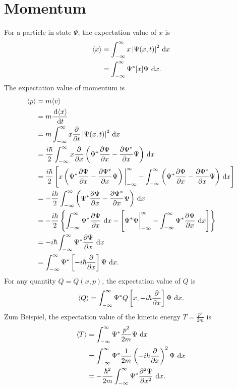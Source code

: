 \documentclass[en, oneside]{vivi}
\begin{document}
\section{Momentum}
For a particle in state $\Psi$, the expectation value of $x$ is
\begin{align}
    \langle x \rangle &= \int_{-\infty}^{\infty} x \left\lvert \Psi(x,t) \right\rvert^2 \dif x\\
    &= \int_{-\infty}^{\infty}  \Psi^* [x] \Psi \dif x.
\end{align}
The expectation value of momentum is
\begin{align}
    \langle p \rangle &= m \langle v \rangle\\
    &= m \frac{\dif \langle x \rangle}{\dif t}\\
    &= m \int_{-\infty}^{\infty} x \frac{\partial}{\partial t} \left\lvert \Psi(x,t) \right\rvert^2 \dif x\\
    &= \frac{i \hbar}{2}\int_{-\infty}^{\infty} x \frac{\partial}{\partial x} \left( \Psi^*\frac{\partial \Psi}{\partial x} - \frac{\partial \Psi^*}{\partial x}\Psi \right) \dif x\\
    &= \frac{i \hbar}{2}\left[x\left( \Psi^*\frac{\partial \Psi}{\partial x} - \frac{\partial \Psi^*}{\partial x}\Psi \right)\bigg|_{-\infty}^{\infty} -
    \int_{-\infty}^{\infty} \left( \Psi^*\frac{\partial \Psi}{\partial x} - \frac{\partial \Psi^*}{\partial x}\Psi \right) \dif x\right]\\
    &= -\frac{i \hbar}{2}\int_{-\infty}^{\infty} \left( \Psi^*\frac{\partial \Psi}{\partial x} - \frac{\partial \Psi^*}{\partial x}\Psi \right) \dif x\\
    &= -\frac{i \hbar}{2}\left\{ \int_{-\infty}^{\infty} \Psi^*\frac{\partial \Psi}{\partial x} \dif x - \left[\Psi^*\Psi\bigg|_{-\infty}^{\infty} - \int_{-\infty}^{\infty} \Psi^*\frac{\partial \Psi}{\partial x} \dif x\right] \right\}\\
    &= -i \hbar \int_{-\infty}^{\infty} \Psi^*\frac{\partial \Psi}{\partial x} \dif x\\
    &= \int_{-\infty}^{\infty} \Psi^*\left[ -i \hbar \frac{\partial}{\partial x} \right]\Psi \dif x.
\end{align}
For any quantity $Q = Q(x,p)$, the expectation value of $Q$ is
\begin{equation}
    \langle Q \rangle = \int_{-\infty}^{\infty} \Psi^* Q \left[ x, -i \hbar \frac{\partial}{\partial x} \right] \Psi \dif x.
\end{equation}
Zum Beispiel, the expectation value of the kinetic energy $T = \frac{p^2}{2m}$ is
\begin{align}
    \langle T \rangle &= \int_{-\infty}^{\infty} \Psi^* \frac{p^2}{2m} \Psi \dif x\\
    &= \int_{-\infty}^{\infty} \Psi^* \frac{1}{2m} \left( -i \hbar \frac{\partial}{\partial x} \right)^2 \Psi \dif x\\
    &= -\frac{\hbar^2}{2m} \int_{-\infty}^{\infty} \Psi^* \frac{\partial^2 \Psi}{\partial x^2} \dif x.
\end{align}
\end{document}
